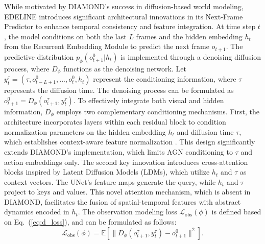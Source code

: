 While motivated by DIAMOND's success in diffusion-based world modeling, EDELINE introduces significant architectural innovations in its Next-Frame Predictor to enhance temporal consistency and feature integration. At time step $t$, the model conditions on both the last $L$ frames and the hidden embedding $h_t$ from the Recurrent Embedding Module to predict the next frame $\hat{o}_{t+1}$. The predictive distribution $p_\phi(o^0_{t+1}|h_t)$ is implemented through a denoising diffusion process, where $D_\phi$ functions as the denoising network. Let $y_t^{\tau} = (\tau, o^0_{t-L+1}, ..., o^0_t, h_t)$ represent the conditioning information, where $\tau$ represents the diffusion time. The denoising process can be formulated as $o^0_{t+1} = D_\phi(o^{\tau}_{t+1}, y_t^{\tau}).$
To effectively integrate both visual and hidden information, $D_\phi$ employs two complementary conditioning mechanisms. First, the architecture incorporates \cite{AGN} layers within each residual block to condition normalization parameters on the hidden embedding $h_t$ and diffusion time $\tau$, which establishes context-aware feature normalization \cite{AGN}. This design significantly extends DIAMOND's implementation, which limits AGN conditioning to $\tau$ and action embeddings only. The second key innovation introduces cross-attention blocks inspired by Latent Diffusion Models (LDMs), which utilize $h_t$ and $\tau$ as context vectors. The UNet's feature maps generate the query, while $h_t$ and $\tau$ project to keys and values. This novel attention mechanism, which is absent in DIAMOND, facilitates the fusion of spatial-temporal features with abstract dynamics encoded in $h_t$. The observation modeling loss $\mathcal{L}_{\text{obs}}(\phi)$ is defined based on Eq.~(\ref{eq:d_loss}), and can be formulated as follows:
\begin{equation}
\mathcal{L}_{\text{obs}}(\phi) = \mathbb{E}\left[\|D_\phi(o^{\tau}_{t+1}, y_t^{\tau}) - o^0_{t+1}\|^2\right].
\end{equation}
